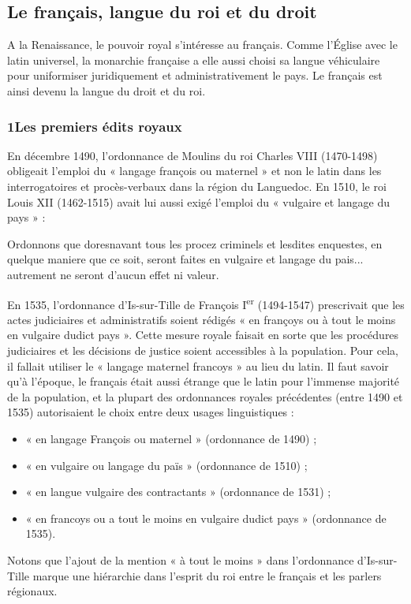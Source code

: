 \subsection{Le français, langue du roi et du droit}
A la Renaissance, le pouvoir royal s’intéresse au français. Comme l’Église avec le latin universel, la monarchie française a elle aussi choisi sa langue véhiculaire pour uniformiser juridiquement et administrativement le pays. Le français est ainsi devenu la langue du droit et du roi.
\subsubsection*{1\quad Les premiers édits royaux}
En décembre 1490, l’ordonnance de Moulins du roi Charles VIII (1470-1498) obligeait l’emploi du « langage françois ou maternel » et non le latin dans les interrogatoires et procès-verbaux dans la région du Languedoc. En 1510, le roi Louis XII (1462-1515) avait lui aussi exigé l’emploi du « vulgaire et langage du pays » :
\begin{lecture}{}
Ordonnons que doresnavant tous les procez criminels et lesdites enquestes, en quelque maniere que ce soit, seront faites en vulgaire et langage du pais... autrement ne seront d’aucun effet ni valeur.
\end{lecture}
En 1535, l’ordonnance d’Is-sur-Tille de François I\textsuperscript{er} (1494-1547) prescrivait que les actes judiciaires et administratifs soient rédigés « en françoys ou à tout le moins en vulgaire dudict pays ». Cette mesure royale faisait en sorte que les procédures judiciaires et les décisions de justice soient accessibles à la population. Pour cela, il fallait utiliser le « langage maternel francoys » au lieu du latin. Il faut savoir qu’à l’époque, le français était aussi étrange que le latin pour l’immense
majorité de la population, et la plupart des ordonnances royales précédentes (entre 1490 et 1535) autorisaient le choix entre deux usages linguistiques :
\begin{itemize}
\item « en langage François ou maternel » (ordonnance de 1490) ;
\item « en vulgaire ou langage du païs » (ordonnance de 1510) ;
\item « en langue vulgaire des contractants » (ordonnance de 1531) ;
\item « en francoys ou a tout le moins en vulgaire dudict pays » (ordonnance de 1535).
\end{itemize}
Notons que l’ajout de la mention « à tout le moins » dans l’ordonnance d’Is-sur-Tille marque une hiérarchie dans l’esprit du roi entre le français et les parlers régionaux.

